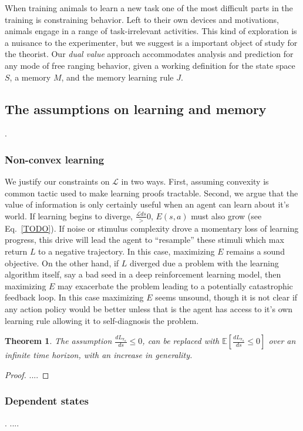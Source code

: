 \documentclass[9pt,twocolumn,twoside]{pnas-new}
\newtheorem{theorem}{Theorem}
\begin{document}
When training animals to learn a new task one of the most difficult parts in the training is constraining behavior. Left to their own devices and motivations, animals engage in a range of task-irrelevant activities. This kind of exploration is a nuisance to the experimenter, but we suggest is a important object of study for the theorist. Our \textit{dual value} approach accommodates analysis and prediction for any mode of free ranging behavior, given a working definition for the state space $S$, a memory $M$, and the memory learning rule $J$.

\subsection*{The assumptions on learning and memory}.
\subsubsection{Non-convex learning}
We justify our constraints on $\mathcal{L}$ in two ways. First, assuming convexity is common tactic used to make learning proofs tractable. Second, we argue that the value of information is only certainly useful when an agent can learn about it's world. If learning begins to diverge, $\frac{\mathcal{L}{ds}} > 0$, $E(s, a)$ must also grow (see Eq.~\ref{TODO}). If noise or stimulus complexity drove a momentary loss of learning progress, this drive will lead the agent to ``resample'' these stimuli which max return $L$ to a negative trajectory. In this case, maximizing $E$ remains a sound objective. On the other hand, if $L$ diverged due a problem with the learning algorithm itself, say a bad seed in a deep reinforcement learning model, then maximizing $E$ may exacerbate the problem leading to a potentially catastrophic feedback loop. In this case maximizing $E$ seems unsound, though it is not clear if any action policy would be better unless that is the agent has access to it's own learning rule allowing it to self-diagnosis the problem.

\begin{theorem}
    The assumption $\frac{dL_{\pi_{a}}}{ds} \leq 0$, can be replaced with $\mathbb{E} [\frac{dL_{\pi_{a}}}{ds} \leq 0]$ over an infinite time horizon, with an increase in generality.
\end{theorem}
\begin{proof}
....
\end{proof}


\subsubsection*{Dependent states}.
....
\end{document}
